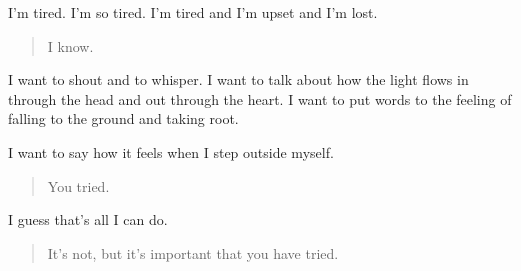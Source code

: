 I'm tired. I'm so tired. I'm tired and I'm upset and I'm lost.

\begin{quote}
I know.
\end{quote}

I want to shout and to whisper. I want to talk about how the light flows in through the head and out through the heart. I want to put words to the feeling of falling to the ground and taking root.

I want to say how it feels when I step outside myself.

\begin{quote}
You tried.
\end{quote}

I guess that's all I can do.

\begin{quote}
It's not, but it's important that you have tried.
\end{quote}
